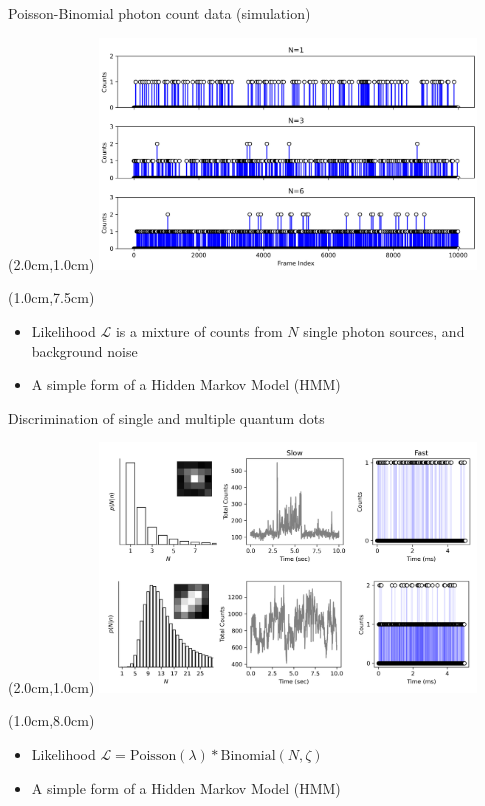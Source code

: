 \documentclass{beamer}					%
\begin{document}
\begin{frame}{Poisson-Binomial photon count data (simulation)}
\begin{textblock*}{10cm}(2.0cm,1.0cm)
\includegraphics[width=10cm]{../../spad/spad/media/Counts.png}
\end{textblock*}
\begin{textblock*}{13cm}(1.0cm,7.5cm)
\begin{itemize}
\item Likelihood $\mathcal{L}$ is a mixture of counts from $N$ single photon sources, and background noise
\item A simple form of a Hidden Markov Model (HMM) 
\end{itemize}
\end{textblock*}

\end{frame}

\begin{frame}{Discrimination of single and multiple quantum dots}
\begin{textblock*}{10cm}(2.0cm,1.0cm)
\includegraphics[width=10cm]{../../spad/spad/media/CountQD.png}
\end{textblock*}
\begin{textblock*}{13cm}(1.0cm,8.0cm)
\begin{itemize}
\item Likelihood $\mathcal{L} = \mathrm{Poisson}(\lambda)* \mathrm{Binomial}(N,\zeta)$
\item A simple form of a Hidden Markov Model (HMM) 
\end{itemize}
\end{textblock*}

\end{frame}
\end{document}
